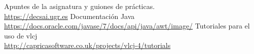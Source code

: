 
\clearpage
\begin{thebibliography}{X}
\bibitem{} Apuntes de la asignatura y guiones de prácticas.\\
\url{https://decsai.ugr.es}
\bibitem{} Documentación Java \\ \url{https://docs.oracle.com/javase/7/docs/api/java/awt/image/}
\bibitem{} Tutoriales para el uso de vlcj \\ \url{http://capricasoftware.co.uk/projects/vlcj-4/tutorials}
\end{thebibliography}

